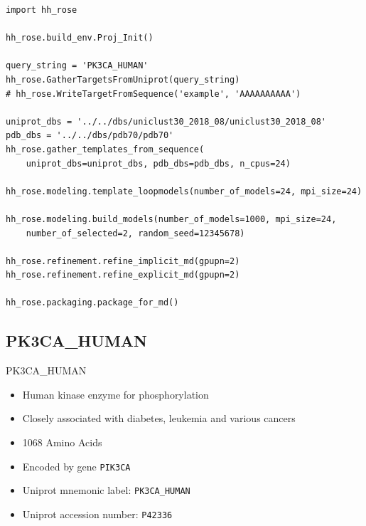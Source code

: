 \documentclass{beamer}
\begin{document}
\begin{frame}[fragile]
\begin{verbatim}
import hh_rose

hh_rose.build_env.Proj_Init()

query_string = 'PK3CA_HUMAN'
hh_rose.GatherTargetsFromUniprot(query_string)
# hh_rose.WriteTargetFromSequence('example', 'AAAAAAAAAA')

uniprot_dbs = '../../dbs/uniclust30_2018_08/uniclust30_2018_08'
pdb_dbs = '../../dbs/pdb70/pdb70'
hh_rose.gather_templates_from_sequence(
	uniprot_dbs=uniprot_dbs, pdb_dbs=pdb_dbs, n_cpus=24)

hh_rose.modeling.template_loopmodels(number_of_models=24, mpi_size=24)

hh_rose.modeling.build_models(number_of_models=1000, mpi_size=24, 
	number_of_selected=2, random_seed=12345678)

hh_rose.refinement.refine_implicit_md(gpupn=2)
hh_rose.refinement.refine_explicit_md(gpupn=2)

hh_rose.packaging.package_for_md()

\end{verbatim}
\end{frame}

\subsection{PK3CA\_HUMAN}
\begin{frame}{PK3CA\_HUMAN}
\begin{itemize}
	\item {
		Human kinase enzyme for phosphorylation
	}
	\item 
	Closely associated with diabetes, leukemia and various cancers
	\item 
	1068 Amino Acids 
	\item Encoded by gene \texttt{PIK3CA}
	\item 
	Uniprot mnemonic label: \texttt{PK3CA\_HUMAN}
	\item Uniprot accession number: \texttt{P42336}
\end{itemize}
\end{frame}
\end{document}
